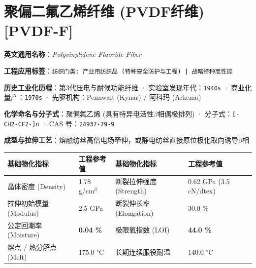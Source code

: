 \documentclass[11pt,openright,twoside,UTF8]{ctexbook}
\begin{document}
\section{聚偏二氟乙烯纤维 (PVDF纤维) [PVDF-F]}
\label{sec:pvdf-f}

\noindent\textbf{英文通用名称}：\textit{Polyvinylidene Fluoride Fiber}\par
\noindent\textbf{工程应用标签}：\texttt{纺织门类: 产业用纺织品 (特种安全防护与工程) | 战略特种高性能}\par
\noindent\textbf{历史工业化历程}：第3代压电与耐候功能纤维 · 实验室发现年代：\texttt{1940s} · 商业化量产：\texttt{1970s} · 先驱机构：Pennwalt (Kynar) / 阿科玛 (Arkema)\par
\noindent\textbf{化学命名与分子式}：聚偏氟乙烯 (具有特异电活性$\beta$相偶极排列) · 分子式：\texttt{[-CH2-CF2-]n} · CAS 号：\texttt{24937-79-9}\par
\noindent\textbf{成型与拉伸工艺}：熔融纺丝高倍电场牵伸，或静电纺丝直接原位极化取向诱导$\beta$相\par

\vspace{0.15cm}
\begin{center}
\small
\begin{tabularx}{\textwidth}{p{3.8cm}Xp{3.8cm}X}
\toprule
\textbf{基础物化指标} & \textbf{工程参考值} & \textbf{基础物化指标} & \textbf{工程参考值} \\
\midrule
晶体密度 (Density) & 1.78 g/cm$^3$ & 断裂拉伸强度 (Strength) & 0.62 GPa (3.5 cN/dtex) \\
拉伸初始模量 (Modulus) & 2.5 GPa & 断裂伸长率 (Elongation) & 30.0 \% \\
公定回潮率 (Moisture) & \textbf{0.04 \%} & 极限氧指数 (LOI) & \textbf{44.0 \%} \\
熔点 / 热分解点 (Melt) & 175.0 $^\circ\mathrm{C}$ & 长期连续服役耐温 & 140.0 $^\circ\mathrm{C}$ \\
\bottomrule
\end{tabularx}
\end{center}
\vspace{0.15cm}
\end{document}
